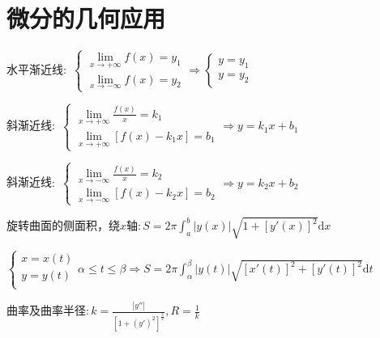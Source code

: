 \section{微分的几何应用}

\begin{spacing}{\hangju}
    \noindent 水平渐近线$\colon$
        $\left\{\begin{aligned}
            \lim\limits_{x \to +\infty}{f(x)} = y_{1} \\
            \lim\limits_{x \to -\infty}{f(x)} = y_{2}
        \end{aligned}\right.
        \Rightarrow
        \left\{\begin{aligned}
            y = y_{1} \\
            y = y_{2}
        \end{aligned}\right.$

    \noindent 斜渐近线$\colon$
        $\begin{cases}
            \lim\limits_{x \to +\infty}{\frac{f(x)}{x}} = k_{1} \\
            \lim\limits_{x \to +\infty}{[f(x) - k_{1}x]} = b_{1}
        \end{cases}
        \Rightarrow y = k_{1}x + b_{1}$

    \noindent 斜渐近线$\colon$
    $\begin{cases}
        \lim\limits_{x \to -\infty}{\frac{f(x)}{x}} = k_{2} \\
        \lim\limits_{x \to -\infty}{[f(x) - k_{2}x]} = b_{2}
    \end{cases}
    \Rightarrow y = k_{2}x + b_{2}$

    \noindent $\mbox{旋转曲面的侧面积，绕}x\mbox{轴}\colon S = 2\pi\int_{a}^{b}{|y(x)|\sqrt{1 + [y'(x)]^2}\mathrm{d}x}$

    \noindent $\left\{\begin{array}{l}
        x = x(t)\\
        y = y(t)\\
    \end{array}\right. \alpha \le t \le \beta \Rightarrow S = 2\pi\int_{\alpha}^{\beta}{|y(t)|\sqrt{[x'(t)]^2 + [y'(t)]^2}\mathrm{d}t}$

    \noindent $\mbox{曲率及曲率半径}\colon k = \frac{|y''|}{[1 + (y')^2]^{\frac{3}{2}}}, R = \frac{1}{k}$
\end{spacing}